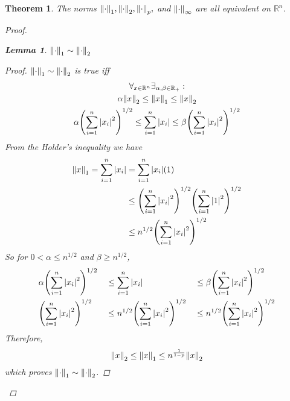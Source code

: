 \documentclass[]{article}
\newcommand{\R}{\mathbb{R}}
\newtheorem{theorem}{Theorem}
\newtheorem{lemma}{Lemma}
\begin{document}
\newpage
\begin{theorem}
    The norms $\norm{\cdot}_1,\norm{\cdot}_2,\norm{\cdot}_p,$ and $\norm{\cdot}_\infty$ are all equivalent on $\R^n$.
    \begin{proof}
        \begin{lemma}\label{lem:1to2}
            $\norm{\cdot}_1 \sim \norm{\cdot}_2$
            \begin{proof}
                $\norm{\cdot}_1 \sim \norm{\cdot}_2$ is true iff
                \begin{multline*}
                    \forall_{x \in \R^n} \exists_{\alpha,\beta \in \R_+} :\\
                    \alpha \norm{x}_2 
                        \leq \norm{x}_1 
                        \leq \norm{x}_2\\
                    \alpha \qty(\sum_{i=1}^n \abs{x_i}^2)^{1/2}
                        \leq \sum_{i=1}^n \abs{x_i}
                        \leq \beta \qty(\sum_{i=1}^n \abs{x_i}^2)^{1/2}\\
                \end{multline*}
                From the Holder's inequality we have 
                \begin{align*}
                    \norm{x}_1 = \sum_{i=1}^n \abs{x_i}
                        &= \sum_{i=1}^n \abs{x_i} (1)\\
                        &\leq \qty(\sum_{i=1}^n \abs{x_i}^2)^{1/2}
                            \qty(\sum_{i=1}^n \abs{1}^{2})^{1/2}\\
                        &\leq n^{1/2} \qty(\sum_{i=1}^n \abs{x_i}^2)^{1/2} 
                \end{align*}
                So for $0 < \alpha \leq n^{1/2}$ and $\beta \geq n^{1/2}$,
                \begin{align*}
                    &\alpha \qty(\sum_{i=1}^n \abs{x_i}^2)^{1/2}
                        &&\leq \sum_{i=1}^n \abs{x_i}
                        &&\leq \beta \qty(\sum_{i=1}^n \abs{x_i}^2)^{1/2}\\
                    &\qty(\sum_{i=1}^n \abs{x_i}^2)^{1/2}
                        &&\leq n^{1/2} \qty(\sum_{i=1}^n \abs{x_i}^2)^{1/2} 
                        &&\leq n^{1/2} \qty(\sum_{i=1}^n \abs{x_i}^2)^{1/2}
                \end{align*}
                Therefore,
                \[\norm{x}_2 \leq \norm{x}_1 \leq n^{\frac{1}{1-p}} \norm{x}_2\]
                which proves $\norm{\cdot}_1 \sim \norm{\cdot}_2$.

\end{proof}
\end{lemma}
\end{proof}
\end{theorem}
\end{document}
